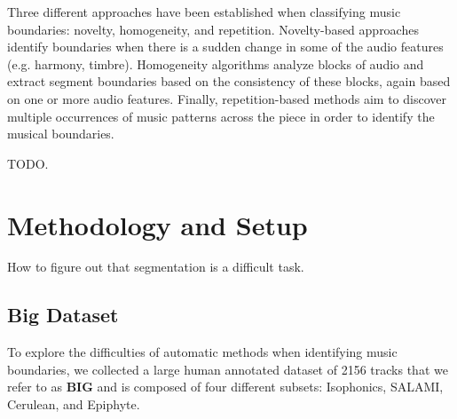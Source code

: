 \documentclass{article}
\begin{document}
Three different approaches have been established when classifying music boundaries: novelty, homogeneity, and repetition\cite{Paulus2010}. 
Novelty-based approaches identify boundaries when there is a sudden change in some of the audio features (e.g. harmony, timbre).
Homogeneity algorithms analyze blocks of audio and extract segment boundaries based on the consistency of these blocks, again based on one or more audio features.
Finally, repetition-based methods aim to discover multiple occurrences of music patterns across the piece in order to identify the musical boundaries.

TODO.




\section{Methodology and Setup}\label{sec:prelExp}

How to figure out that segmentation is a difficult task.

\subsection{Big Dataset}

To explore the difficulties of automatic methods when identifying music boundaries, we collected a large human annotated dataset of 2156 tracks that we refer to as \textbf{BIG} and is composed of four different subsets: Isophonics, SALAMI, Cerulean, and Epiphyte.
\end{document}
